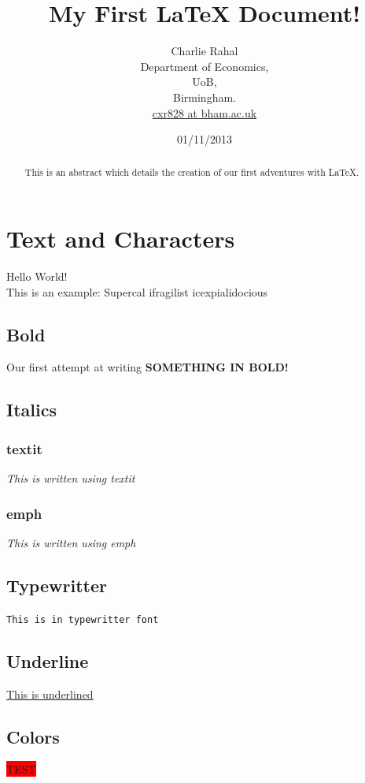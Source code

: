 \documentclass[a4paper, 12pt]{article}
\begin{document}
\title{My First LaTeX Document!}
\date{01/11/2013}
\author{Charlie Rahal\\
Department of Economics,\\
UoB,\\
Birmingham.\\
\href{mailto:CXR828@bham.ac.uk}{cxr828 at bham.ac.uk}}
\maketitle
\begin{abstract}
This is an abstract which details the creation of our first adventures with \LaTeX.
\end{abstract}
\tableofcontents

\newpage
\section{Text and Characters}
Hello World!\\

This is an %
example: Supercal%
ifragilist%
icexpialidocious

\subsection{Bold}
Our first attempt at writing \textbf{SOMETHING IN BOLD!}
\subsection{Italics}
\subsubsection{textit}
\textit{This is written using textit}
\subsubsection{emph}
\emph{This is written using emph}
\subsection{Typewritter}
\texttt{This is in typewritter font}
\subsection{Underline}
\underline{This is underlined}
\subsection{Colors}
\colorbox{red}{TEST}
\end{document}

